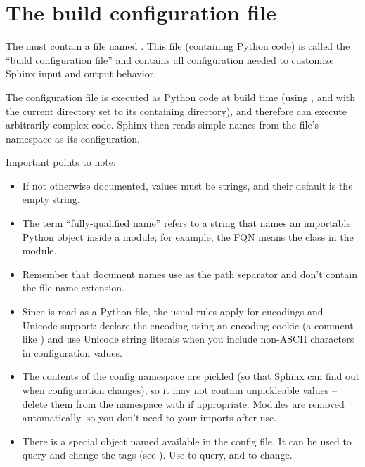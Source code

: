\documentclass[letterpaper,10pt,english]{sphinxmanual}
\begin{document}
\chapter{The build configuration file}
\label{config:module-conf}\label{config:build-config}\label{config:the-build-configuration-file}\label{config::doc}
The {\hyperref[glossary:term\string-configuration\string-directory]{}} must contain a file named .
This file (containing Python code) is called the ``build configuration file'' and
contains all configuration needed to customize Sphinx input and output behavior.

The configuration file is executed as Python code at build time (using
, and with the current directory set to its containing
directory), and therefore can execute arbitrarily complex code.  Sphinx then
reads simple names from the file's namespace as its configuration.

Important points to note:
\begin{itemize}
\item {} 
If not otherwise documented, values must be strings, and their default is the
empty string.

\item {} 
The term ``fully-qualified name'' refers to a string that names an importable
Python object inside a module; for example, the FQN
 means the  class in the
 module.

\item {} 
Remember that document names use \code{/} as the path separator and don't contain
the file name extension.

\item {} 
Since  is read as a Python file, the usual rules apply for
encodings and Unicode support: declare the encoding using an encoding cookie
(a comment like ) and use Unicode string literals
when you include non-ASCII characters in configuration values.

\item {} 
The contents of the config namespace are pickled (so that Sphinx can find out
when configuration changes), so it may not contain unpickleable values --
delete them from the namespace with  if appropriate.  Modules are
removed automatically, so you don't need to  your imports after use.

\item {} 
There is a special object named  available in the config file.
It can be used to query and change the tags (see {\hyperref[markup/misc:tags]{}}).  Use
 to query,  and 
to change.

\end{itemize}
\end{document}
